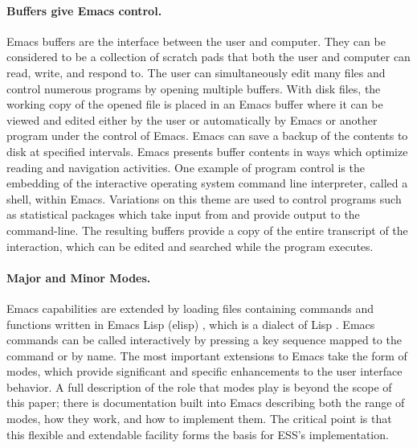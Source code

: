 \documentclass{article}
\newcommand{\stexttt}[1]{{\small\texttt{#1}}}
\begin{document}
\paragraph{Buffers give Emacs control.}
Emacs buffers are the interface between the user and computer.  They
can be considered to be a collection of scratch pads that both the
user and computer can read, write, and respond to.  The user can
simultaneously edit many files and control numerous programs by
opening multiple buffers.  With disk files, the working copy of the
opened file is placed in an Emacs buffer where it can be viewed and
edited either by the user or automatically by Emacs or another program
under the control of Emacs.  Emacs can save a backup of the contents
to disk at specified intervals.  Emacs presents buffer contents in
ways which optimize reading and navigation activities.  One example of
program control is the embedding of the interactive operating system
command line interpreter, called a shell, within Emacs.  Variations on
this theme are used to control programs such as statistical packages
which take input from and provide output to the command-line.  The
resulting buffers provide a copy of the entire transcript of the
interaction, which can be edited and searched while the program
executes.

\paragraph{Major and Minor Modes.}
Emacs capabilities are extended by loading files containing commands
and functions written in Emacs Lisp (elisp) \citep{RChassell1999},
which is a dialect of Lisp \citep{PGraham:1996}.  Emacs commands can
be called interactively by pressing a key sequence mapped to the
command or by name.  The most important extensions to Emacs take the
form of modes, which provide significant and specific enhancements to
the user interface behavior.  A full description of the role that
modes play is beyond the scope of this paper; there is documentation
built into Emacs describing both the range of modes, how they work,
and how to implement them.  The critical point is that this flexible
and extendable facility forms the basis for ESS's implementation.

\end{document}
